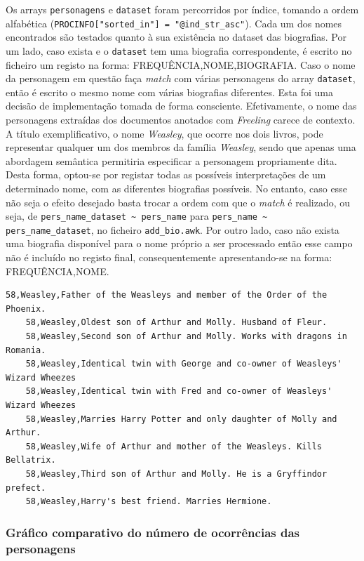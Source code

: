 \documentclass[a4paper]{article}
\begin{document}
Os arrays \texttt{personagens} e \texttt{dataset} foram percorridos por índice, tomando a ordem alfabética (\texttt{PROCINFO["sorted\_in"] = "@ind\_str\_asc"}). Cada um dos nomes encontrados são testados quanto à sua existência no dataset das biografias. Por um lado, caso exista e o \texttt{dataset} tem uma biografia correspondente, é escrito no ficheiro um registo na forma: FREQUÊNCIA,NOME,BIOGRAFIA. Caso o nome da personagem em questão faça \textit{match} com várias personagens do array \texttt{dataset}, então é escrito o mesmo nome com várias biografias diferentes. Esta foi uma decisão de implementação tomada de forma consciente. Efetivamente, o nome das personagens extraídas dos documentos anotados com \textit{Freeling} carece de contexto. A título exemplificativo, o nome \textit{Weasley}, que ocorre nos dois livros, pode representar qualquer um dos membros da família \textit{Weasley}, sendo que apenas uma abordagem semântica permitiria especificar a personagem propriamente dita. Desta forma, optou-se por registar todas as possíveis interpretações de um determinado nome, com as diferentes biografias possíveis. No entanto, caso esse não seja o efeito desejado basta trocar a ordem com que o \textit{match} é realizado, ou seja, de \texttt{pers\_name\_dataset \~{} pers\_name} para \texttt{pers\_name \~{} pers\_name\_dataset}, no ficheiro \texttt{add\_bio.awk}. Por outro lado, caso não exista uma biografia disponível para o nome próprio a ser processado então esse campo não é incluído no registo final, consequentemente apresentando-se na forma: FREQUÊNCIA,NOME.

\begin{lstlisting}[caption=Repetição da biografia para um mesmo nome]
	58,Weasley,Father of the Weasleys and member of the Order of the Phoenix.
	58,Weasley,Oldest son of Arthur and Molly. Husband of Fleur. 
	58,Weasley,Second son of Arthur and Molly. Works with dragons in Romania.
	58,Weasley,Identical twin with George and co-owner of Weasleys' Wizard Wheezes
	58,Weasley,Identical twin with Fred and co-owner of Weasleys' Wizard Wheezes
	58,Weasley,Marries Harry Potter and only daughter of Molly and Arthur.
	58,Weasley,Wife of Arthur and mother of the Weasleys. Kills Bellatrix.
	58,Weasley,Third son of Arthur and Molly. He is a Gryffindor prefect.
	58,Weasley,Harry's best friend. Marries Hermione.
\end{lstlisting}

\subsubsection{Gráfico comparativo do número de ocorrências das personagens}
\end{document}
